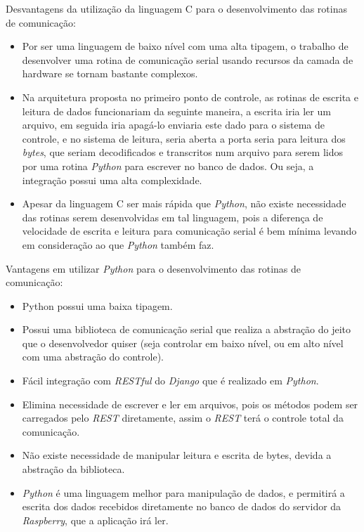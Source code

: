 Desvantagens da utilização da linguagem C para o desenvolvimento das rotinas de comunicação:

\begin{itemize}
    \item Por ser uma linguagem de baixo nível com uma alta tipagem, o trabalho de desenvolver uma rotina de comunicação serial usando recursos da camada de hardware se tornam bastante complexos.
    \item Na arquitetura proposta no primeiro ponto de controle, as rotinas de escrita e leitura de dados funcionariam da seguinte maneira, a escrita iria ler um arquivo, em seguida iria apagá-lo enviaria este dado para o sistema de controle, e no sistema de leitura, seria aberta a porta seria para leitura dos \textit{bytes}, que seriam decodificados e transcritos num arquivo para serem lidos por uma rotina \textit{Python} para escrever no banco de dados. Ou seja, a integração possui uma alta complexidade.
    \item Apesar da linguagem C ser mais rápida que \textit{Python}, não existe necessidade das rotinas serem desenvolvidas em tal linguagem, pois a diferença de velocidade de escrita e leitura para comunicação serial é bem mínima levando em consideração ao que \textit{Python} também faz.
\end{itemize}

Vantagens em utilizar \textit{Python} para o desenvolvimento das rotinas de comunicação:

\begin{itemize}
    \item Python possui uma baixa tipagem.
    \item Possui uma biblioteca de comunicação serial que realiza a abstração do jeito que o desenvolvedor quiser (seja controlar em baixo nível, ou em alto nível com uma abstração do controle).
    \item Fácil integração com \textit{RESTful} do \textit{Django} que é realizado em \textit{Python}.
    \item Elimina necessidade de escrever e ler em arquivos, pois os métodos podem ser carregados pelo \textit{REST} diretamente, assim o \textit{REST} terá o controle total da comunicação.
    \item Não existe necessidade de manipular leitura e escrita de bytes, devida a abstração da biblioteca.
    \item \textit{Python} é uma linguagem melhor para manipulação de dados, e permitirá a escrita dos dados recebidos diretamente no banco de dados do servidor da \textit{Raspberry}, que a aplicação irá ler.
\end{itemize}

